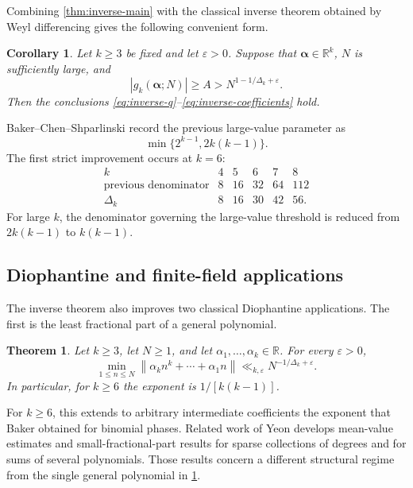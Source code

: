 \documentclass[11pt,reqno]{amsart}
\numberwithin{equation}{section}
\newtheorem{theorem}{Theorem}[section]
\newtheorem{corollary}[corollary]{Corollary}
\theoremstyle{definition}
\theoremstyle{remark}
\begin{document}
Combining \cref{thm:inverse-main} with the classical inverse theorem obtained
by Weyl differencing gives the following convenient form.

\begin{corollary}\label{cor:combined-inverse}
Let $k\ge3$ be fixed and let $\varepsilon>0$.  Suppose that
$\boldsymbol\alpha\in\mathbb R^k$, $N$ is sufficiently large, and
\begin{equation}\label{eq:combined-threshold}
  |g_k(\boldsymbol\alpha;N)|\ge A
  >N^{1-1/\Delta_k+\varepsilon}.
\end{equation}
Then the conclusions
\eqref{eq:inverse-q}--\eqref{eq:inverse-coefficients} hold.
\end{corollary}

Baker--Chen--Shparlinski \cite[Lemma~2.6]{BakerChenShparlinski2024} record
the previous large-value parameter as
\[
  \min\{2^{k-1},2k(k-1)\}.
\]
The first strict improvement occurs at $k=6$:
\[
\begin{array}{c|ccccc}
  k&4&5&6&7&8\\ \hline
  \text{previous denominator}&8&16&32&64&112\\
  \Delta_k&8&16&30&42&56.
\end{array}
\]
For large $k$, the denominator governing the large-value threshold is
reduced from $2k(k-1)$ to $k(k-1)$.

\subsection{Diophantine and finite-field applications}

The inverse theorem also improves two classical Diophantine applications.
The first is the least fractional part of a general polynomial.

\begin{theorem}\label{thm:small-fractional-parts-intro}
Let $k\ge3$, let $N\ge1$, and let
$\alpha_1,\ldots,\alpha_k\in\mathbb R$.  For every $\varepsilon>0$,
\begin{equation}\label{eq:small-fractional-parts-intro}
  \min_{1\le n\le N}
  \left\|\alpha_kn^k+\cdots+\alpha_1n\right\|
  \ll_{k,\varepsilon}N^{-1/\Delta_k+\varepsilon}.
\end{equation}
In particular, for $k\ge6$ the exponent is $1/[k(k-1)]$.
\end{theorem}

For $k\ge6$, this extends to arbitrary intermediate coefficients the
exponent that Baker obtained for binomial phases.  Related work of Yeon
\cite{Yeon2024} develops mean-value estimates and small-fractional-part
results for sparse collections of degrees and for sums of several
polynomials.  Those results concern a different structural regime from the
single general polynomial in \cref{thm:small-fractional-parts-intro}.
\end{document}
